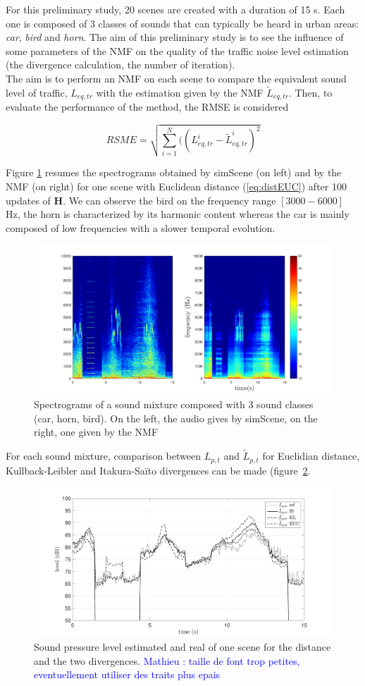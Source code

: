 \documentclass{article}
\newcommand{\ml}[1]{\textcolor{blue}{ Mathieu : #1}}
\begin{document}
\begin{sloppy}
For this preliminary study, 20 scenes are created with a duration of 15 s. Each one is composed of 3 classes of sounds that can typically be heard in urban areas: \textit{car}, \textit{bird} and \textit{horn}. The aim of this preliminary study is to see the influence of some parameters of the NMF on the quality of the traffic noise level estimation (the divergence calculation, the number of iteration).\\

The aim is to perform an NMF on each scene to compare 
the equivalent sound level of traffic, $L_{eq,tr}$ with the estimation given by the NMF $\tilde{L}_{eq,tr}$.
Then, to evaluate the performance of the method, the RMSE is considered

\begin{equation}
RSME = \sqrt{\sum_{i = 1}^N((L^i_{eq,tr}-\tilde{L}^i_{eq,tr})^2}
\end{equation}

Figure \ref{fig:spectrogram} resumes the spectrograms obtained by simScene (on left) and by the NMF (on right) for one scene with Euclidean distance (\ref{eq:distEUC}) after 100 updates of $\mathbf{H}$. We can observe the bird on the frequency range $\left[3000-6000\right]$ Hz, the horn is characterized by its harmonic content whereas the car is mainly composed of low frequencies with a slower temporal evolution.

\begin{figure}[btp]
\centering
\includegraphics[width=.5\textwidth]{./images/bvak_Sc2_V_spectre_Euc.pdf}
\caption{Spectrograms of a sound mixture composed with 3 sound classes (car, horn, bird). On the left, the audio gives by simScene, on the right, one given by the NMF}
\label{fig:spectrogram}
\end{figure}

For each sound mixture, comparison between $L_{p,t}$ and $\tilde{L}_{p,t}$ for Euclidian distance, Kullback-Leibler and Itakura-Saïto divergences can be made (figure~\ref{fig:Lp}.

\begin{figure}[btp]
\centering
\includegraphics[width=.5\textwidth]{images/Lp_bvak_Sc2_It98_nbCl3.pdf}
\caption{Sound pressure level estimated and real of one scene for the distance and the two divergences. \ml{taille de font trop petites, eventuellement utiliser des traits plus epais}}
\label{fig:Lp}
\end{figure}


\end{sloppy}
\end{document}
